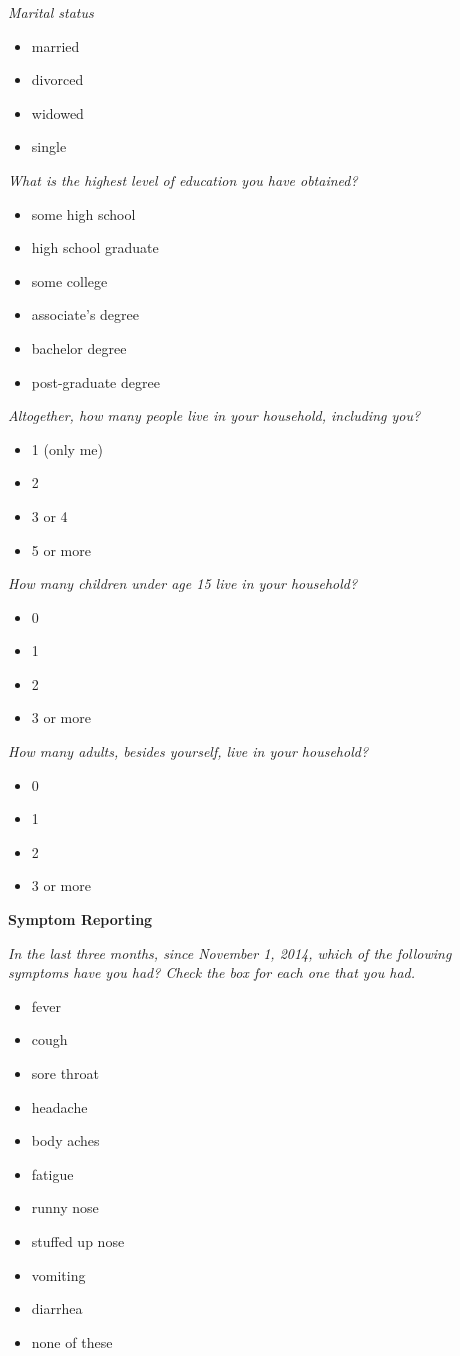 \documentclass[12pt]{article}
\begin{document}
\emph{Marital status}
\begin{itemize}
\item married
\item divorced
\item widowed
\item single
\end{itemize}

\emph{What is the highest level of education you have obtained?}
\begin{itemize}
\item some high school
\item high school graduate
\item some college
\item associate’s degree
\item bachelor degree
\item post-graduate degree
\end{itemize}

\emph{Altogether, how many people live in your household, including you?}
\begin{itemize}
\item 1 (only me)
\item 2
\item 3 or 4
\item 5 or more
\end{itemize}

\emph{How many children under age 15 live in your household?}
\begin{itemize}
\item 0
\item 1
\item 2
\item 3 or more
\end{itemize}

\emph{How many adults, besides yourself, live in your household?}
\begin{itemize}
\item 0
\item 1
\item 2
\item 3 or more
\end{itemize}

\textbf{Symptom Reporting}

\emph{In the last three months, since November 1, 2014, which of the following symptoms have you had? Check the box for each one that you had.}
\begin{itemize}
\item fever
\item cough
\item sore throat
\item headache
\item body aches
\item fatigue
\item runny nose
\item stuffed up nose
\item vomiting
\item diarrhea
\item none of these
\end{itemize}
\end{document}
